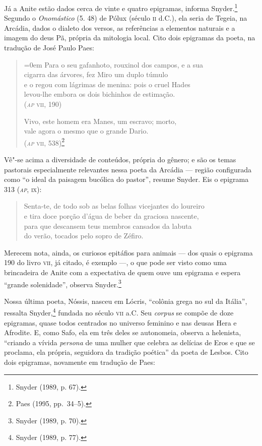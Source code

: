 Já a Anite estão dados cerca de vinte e quatro
epigramas, informa Snyder.\footnote{ Snyder (1989, p. 67).} Segundo o \textit{Onomástico} (5. 48) de
Pólux (século \textsc{ii} d.C.), ela seria de Tegeia, na Arcádia, dados o dialeto dos
versos, as referências a elementos naturais e a imagem do deus Pã, própria da
mitologia local. Cito dois epigramas da poeta, na tradução de José Paulo Paes:

\begin{quote}\parindent=0em 
Para o seu gafanhoto, rouxinol dos campos, e a sua\\
cigarra das árvores, fez Miro um duplo túmulo\\
e o regou com lágrimas de menina: pois o cruel Hades\\
levou-lhe embora os dois bichinhos de estimação.\\
\mbox{}\hfill (\textsc{\textit{ap} vii}, 190)

\smallskip

Vivo, este homem era Manes, um escravo; morto,\\
vale agora o mesmo que o grande Dario.\\
\mbox{}\hfill (\textsc{\textit{ap} vii}, 538)\footnote{ Paes (1995, pp.~34--5).}
\end{quote}

Vê"-se acima a diversidade de conteúdos, própria do gênero; e são os temas
pastorais especialmente relevantes nessa poeta da Arcádia --- região configurada
como “o ideal da paisagem bucólica do pastor”, resume Snyder. Eis o epigrama
313 (\textsc{\textit{ap}}, \textsc{ix}):

\begin{quote}
Senta-te, de todo sob as belas folhas vicejantes do loureiro\\
e tira doce porção d’água de beber da graciosa nascente,\\
para que descansem teus membros cansados da labuta\\
do verão, tocados pelo sopro de Zéfiro.
\end{quote}

Merecem nota, ainda, os curiosos epitáfios para animais --- dos quais o epigrama
190 do livro \textsc{vii}, já citado, é exemplo ---, o que pode ser visto como uma
brincadeira de Anite com a expectativa de quem ouve um epigrama e espera
“grande solenidade”, observa Snyder.\footnote{ Snyder (1989, p. 70).} 

Nossa última poeta, Nóssis, nasceu em Lócris, “colônia grega no sul da Itália”,
ressalta Snyder,\footnote{ Snyder (1989, p. 77).} fundada no século \textsc{vii} a.C. Seu \textit{corpus} se
compõe de doze epigramas, quase todos centrados no
universo feminino e nas deusas Hera e Afrodite. E, como Safo, ela em três deles
se autonomeia, observa a helenista, “criando a vívida \textit{persona} de uma
mulher que celebra as delícias de Eros e que se proclama, ela própria,
seguidora da tradição poética” da poeta de Lesbos. Cito dois epigramas,
novamente em tradução de Paes:

